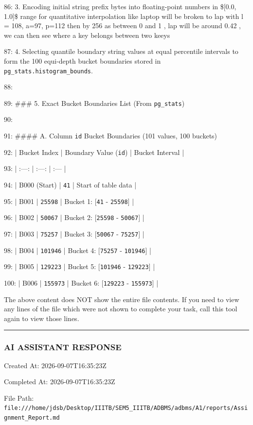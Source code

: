 \documentclass[11pt,a4paper]{article}
\begin{document}
86: 3. Encoding initial string prefix bytes into floating-point numbers in \$[0.0, 1.0]\$ range for quantitative interpolation like laptop will be broken to lap with l = 108, a=97, p=112 then by 256 as between 0 and 1 , lap will be around 0.42 , we can then see where a key belongs between two keeys

87: 4. Selecting quantile boundary string values at equal percentile intervals to form the 100 equi-depth bucket boundaries stored in \texttt{pg\_stats.histogram\_bounds}.

88:

89: \#\#\# 5. Exact Bucket Boundaries List (From \texttt{pg\_stats})

90:

91: \#\#\#\# A. Column \texttt{id} Bucket Boundaries (101 values, 100 buckets)

92: | Bucket Index | Boundary Value (\texttt{id}) | Bucket Interval |

93: | :---: | :---: | :--- |

94: | B000 (Start) | \texttt{41} | Start of table data |

95: | B001 | \texttt{25598} | Bucket 1: [\texttt{41} - \texttt{25598}] |

96: | B002 | \texttt{50067} | Bucket 2: [\texttt{25598} - \texttt{50067}] |

97: | B003 | \texttt{75257} | Bucket 3: [\texttt{50067} - \texttt{75257}] |

98: | B004 | \texttt{101946} | Bucket 4: [\texttt{75257} - \texttt{101946}] |

99: | B005 | \texttt{129223} | Bucket 5: [\texttt{101946} - \texttt{129223}] |

100: | B006 | \texttt{155973} | Bucket 6: [\texttt{129223} - \texttt{155973}] |

The above content does NOT show the entire file contents. If you need to view any lines of the file which were not shown to complete your task, call this tool again to view those lines.


\hrule

\subsubsection{AI ASSISTANT RESPONSE}

Created At: 2026-09-07T16:35:23Z

Completed At: 2026-09-07T16:35:23Z

File Path: \texttt{file:///home/jdsb/Desktop/IIITB/SEM5\_IIITB/ADBMS/adbms/A1/reports/Assignment\_Report.md}
\end{document}
